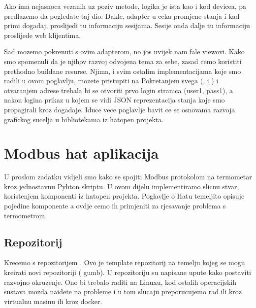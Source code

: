 \documentclass[letterpaper,10pt,croatian]{sphinxmanual}
\begin{document}
\sphinxAtStartPar
Ako ima nejasnoca vezanih uz poziv  metode, logika je ista kao i kod
devicea, pa predlazemo da pogledate taj dio. Dakle, adapter u 
ceka promjene stanja i kad primi dogadaj, proslijedi tu informaciju sesijama.
Sesije onda dalje tu informaciju proslijede web klijentima.

\sphinxAtStartPar
Sad mozemo pokrenuti  s ovim adapterom, no jos uvijek nam fale
viewovi. Kako smo spomenuli da je njihov razvoj odvojena tema za sebe, zasad
cemo koristiti prethodno buildane resurse. Njima, i svim ostalim
implementacijama koje smo radili u ovom poglavlju, mozete pristupiti na 
Pokretanjem svega (,  i ) i otvaranjem
adrese  trebala bi se otvoriti prvo
login stranica (user1, pass1), a nakon logina prikaz u kojem se vidi JSON
reprezentacija stanja koje smo propagirali kroz dogadaje. Iduce vece poglavlje
bavit ce se osnovama razvoja grafickog sucelja u bibliotekama iz hat\sphinxhyphen{}open
projekta.


\chapter{Modbus hat aplikacija}
\label{\detokenize{03-hat-modbus-workshop/index:modbus-hat-aplikacija}}\label{\detokenize{03-hat-modbus-workshop/index::doc}}
\sphinxAtStartPar
U proslom zadatku vidjeli smo kako se spojiti Modbus protokolom na termometar
kroz jednostavnu Pyhton skriptu. U ovom dijelu implementiramo slicnu stvar,
koristenjem komponenti iz hat\sphinxhyphen{}open projekta. Poglavlje o Hatu temeljito opisuje
pojedine komponente a ovdje cemo ih primjeniti za rjesavanje problema s
termometrom.


\section{Repozitorij}
\label{\detokenize{03-hat-modbus-workshop/index:repozitorij}}
\sphinxAtStartPar
Krecemo s repozitorijem . Ovo je template repozitorij
na temelju kojeg se mogu kreirati novi repozitoriji ( gumb).
U repozitoriju su napisane upute kako postaviti razvojno okruzenje. Ono bi
trebalo raditi na Linuxu, kod ostalih operacijskih sustava mozda naidete na
probleme i u tom slucaju preporucujemo rad ili kroz virtualnu masinu ili kroz
docker.
\end{document}
